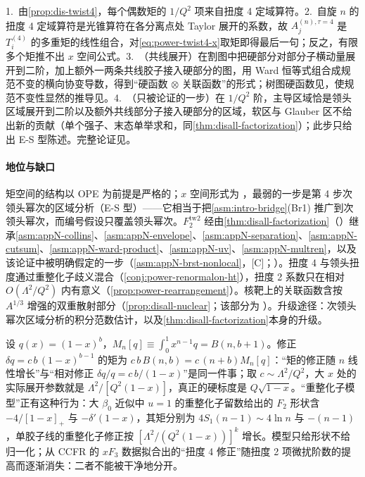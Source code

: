 \begin{proofsketch}
1.~由\cref{prop:dis-twist4}，每个偶数矩的 $1/Q^2$ 项来自扭度 4 定域算符。2.~自旋 $n$ 的扭度 4 定域算符是光锥算符在各分离点处 Taylor 展开的系数，故 $A^{(n),\tau=4}_j$ 是 $T^{(4)}_i$ 的多重矩的线性组合，对\eqref{eq:power-twist4-x}取矩即得最后一句；反之，有限多个矩推不出 $x$ 空间公式。3.~（共线展开）在割图中把硬部分对部分子横动量展开到二阶，加上额外一两条共线胶子接入硬部分的图，用 Ward 恒等式组合成规范不变的横向协变导数，得到“硬函数 $\otimes$ 关联函数”的形式\cite{EllisFurmanskiPetronzio1982,EllisFurmanskiPetronzio1983}；树图硬函数见\cite{Jaffe:1982pm,EllisFurmanskiPetronzio1983}，使规范不变性显然的推导见\cite{Qiu:1988dn}。4.~（只被论证的一步）在 $1/Q^2$ 阶，主导区域恰是领头区域展开到二阶以及额外共线部分子接入硬部分的区域，软区与 Glauber 区不给出新的贡献（单个强子、末态单举求和，同\cref{thm:disall-factorization}）；此步只给出 E-S 型陈述。完整论证见\cite{EllisFurmanskiPetronzio1983,Qiu:1988dn}。
\end{proofsketch}

\paragraph{地位与缺口}
矩空间的结构以 OPE 为前提是严格的；$x$ 空间形式为 \tagA，最弱的一步是第 4 步次领头幂次的区域分析（E-S 型）——它相当于把\cref{asm:intro-bridge}(Br1) 推广到次领头幂次，而编号假设只覆盖领头幂次。$F_2^{\mathrm{tw2}}$ 经由\cref{thm:disall-factorization}（\tagA）继承\cref{asm:appN-collins}、\cref{asm:appN-envelope}、\cref{asm:appN-separation}、\cref{asm:appN-cutsum}、\cref{asm:appN-ward-product}、\cref{asm:appN-uv}、\cref{asm:appN-multren}，以及该论证中被明确假定的一步（\cref{asm:appN-brst-nonlocal}，[C]；\cite[第~11.3.2~节]{Collins2011}）。扭度 4 与领头扭度通过重整化子歧义混合（\cref{conj:power-renormalon-ht}），扭度 2 系数只在相对 $O(\Lambda^2/Q^2)$ 内有意义（\cref{prop:power-rearrangement}）。核靶上的关联函数含按 $A^{1/3}$ 增强的双重散射部分（\cref{prop:disall-nuclear}；该部分为 \tagP）。升级途径：次领头幂次区域分析的积分范数估计，以及\cref{thm:disall-factorization}本身的升级。

\begin{example}\label{ex:power-twist4-largex}
设 $q(x)=(1-x)^b$，$M_n[q]\equiv\int_0^1x^{n-1}q=B(n,b+1)$。修正 $\delta q=c\,b\,(1-x)^{b-1}$ 的矩为 $c\,b\,B(n,b)=c\,(n+b)M_n[q]$：“矩的修正随 $n$ 线性增长”与“相对修正 $\delta q/q=c\,b/(1-x)$”是同一件事；取 $c\sim\Lambda^2/Q^2$，大 $x$ 处的实际展开参数就是 $\Lambda^2/[Q^2(1-x)]$，真正的硬标度是 $Q\sqrt{1-x}$。“重整化子模型”正有这种行为：大 $\beta_0$ 近似中 $u=1$ 的重整化子留数给出的 $F_2$ 形状含 $-4/[1-x]_+$ 与 $-\delta'(1-x)$\cite[式~(5.33)]{Beneke1999}，其矩分别为 $4S_1(n-1)\sim4\ln n$ 与 $-(n-1)$，单胶子线的重整化子修正按 $[\Lambda^2/(Q^2(1-x))]^k$ 增长\cite[式~(5.37)]{Beneke1999}。模型只给形状不给归一化；从 CCFR 的 $xF_3$ 数据拟合出的“扭度 4 修正”随扭度 2 项微扰阶数的提高而逐渐消失\cite[第~5.2.4~节]{Beneke1999}：二者不能被干净地分开。
\end{example}
